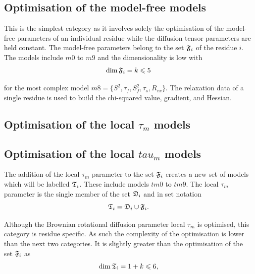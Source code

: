 
\subsection{Optimisation of the model-free models}

This is the simplest category as it involves solely the optimisation of the model-free parameters of an individual residue while the diffusion tensor parameters are held constant.  The model-free parameters belong to the set $\mathfrak{F}_i$ of the residue $i$.  The models include $m0$ to $m9$ and the dimensionality is low with
\begin{equation}
    \dim \mathfrak{F}_i = k \leqslant 5
\end{equation}

\noindent for the most complex model $m8 = \{S^2, \tau_f, S^2_f, \tau_s, R_{ex}\}$.  The relaxation data of a single residue is used to build the chi-squared value, gradient, and Hessian.



\begin{latexonly}
    \subsection{Optimisation of the local $\tau_m$ models}
\end{latexonly}
\begin{htmlonly}
    \subsection{Optimisation of the local $tau_m$ models}
\end{htmlonly}

The addition of the local $\tau_m$ parameter to the set $\mathfrak{F}_i$ creates a new set of models which will be labelled $\mathfrak{T}_i$.  These include models $tm0$ to $tm9$.  The local $\tau_m$ parameter is the single member of the set $\mathfrak{D}_i$ and in set notation
\begin{equation}
    \mathfrak{T}_i = \mathfrak{D}_i \cup \mathfrak{F}_i.
\end{equation}

Although the Brownian rotational diffusion parameter local $\tau_m$ is optimised, this category is residue specific.  As such the complexity of the optimisation is lower than the next two categories.  It is slightly greater than the optimisation of the set $\mathfrak{F}_i$ as
\begin{equation}
    \dim \mathfrak{T}_i = 1 + k \leqslant 6,
\end{equation}

